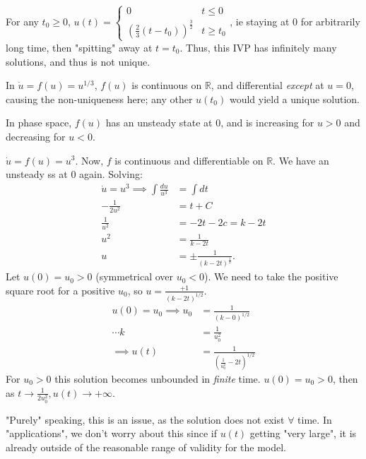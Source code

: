 \documentclass[12pt, oneside]{article}
\begin{document}
\begin{example}
  For any $t_0 \geq 0$, $u(t) = \begin{cases}
    0 & t \leq 0\\
    \left(\frac{2}{3}\left(t-t_0\right)\right)^{\frac{3}{2}} & t \geq t_0
  \end{cases}$, ie staying at $0$ for arbitrarily long time, then "spitting" away at $t = t_0$. Thus, this IVP has infinitely many solutions, and thus is not unique.
   
  In $\dot{u} = f(u) = u^{1/3}$, $f(u)$ is continuous on $\mathbb{R}$, and differential \emph{except} at $u = 0$, causing the non-uniqueness here; any other $u(t_0)$ would yield a unique solution.

  In phase space, $f(u)$ has an unsteady state at $0$, and is increasing for $u > 0$ and decreasing for $u < 0$.
\end{example}

\begin{example}\label{ex:bad2}
  $\dot{u} = f(u) = u^3$. Now, $f$ is continuous and differentiable on $\mathbb{R}$. We have an unsteady ss at $0$ again. Solving:
  \begin{align*}
    \dot{u} = u^3 \implies \int \frac{du}{u^3} &= \int dt\\
    -\frac{1}{2u^2} &= t+C\\
    \frac{1}{u^2} &= -2t -2c = k -2t\\
    u^2 &= \frac{1}{k-2t}\\
    u &= \pm \frac{1}{(k-2t)^\frac{1}{2}}.
  \end{align*}
  Let $u(0) = u_0 > 0$ (symmetrical over $u_0 < 0$). We need to take the positive square root for a positive $u_0$, so $u = \frac{+1}{(k-2t)^{1/2}}$. \begin{align*}
    u(0) = u_0 \implies u_0 &= \frac{1}{(k-0)^{1/2}}\\
    \cdots k & = \frac{1}{u_0^2}\\
    \implies u(t) &= \frac{1}{\left(\frac{1}{u_0^2} - 2t\right)^{1/2}}
  \end{align*}
  For $u_0 > 0$ this solution becomes unbounded in \emph{finite} time. $u(0) = u_0 > 0$, then as $t \to \frac{1}{2u_0^2}, u(t) \to + \infty$.

  "Purely" speaking, this is an issue, as the solution does not exist $\forall$ time. In "applications", we don't worry about this since if $u(t)$ getting "very large", it is already outside of the reasonable range of validity for the model.
\end{example}
\end{document}
